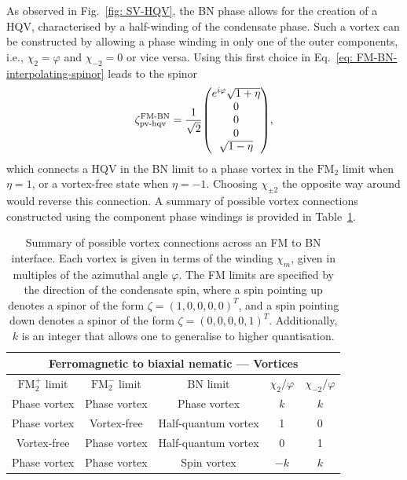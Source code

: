 As observed in Fig.~\ref{fig: SV-HQV}, the BN phase allows for the creation
of a HQV, characterised by a half-winding of the condensate phase.
Such a vortex can be constructed by allowing a phase winding in only one of the
outer components, i.e., \(\chi_2 = \varphi \) and \(\chi_{-2} = 0\) or vice
versa.
Using this first choice in Eq.~\eqref{eq: FM-BN-interpolating-spinor} leads to
the spinor
\begin{align}\label{eq: FM-BN-pv-hqv}
    \zeta^\text{FM-BN}_\text{pv-hqv} = \frac{1}{\sqrt{2}}\mqty(
    e^{i\varphi} \sqrt{1 + \eta} \\
    0 \\
    0 \\
    0 \\
    \sqrt{1 - \eta}),
\end{align}
which connects a HQV in the BN limit to a phase vortex in the \(\text{FM}_2\)
limit when \(\eta = 1\), or a vortex-free state when \(\eta = -1\).
Choosing \(\chi_{\pm 2}\) the opposite way around would reverse this connection.
A summary of possible vortex connections constructed using the component phase
windings is provided in Table~\ref{tab: FM-BN-vortices}.
\begin{table}
    \centering
    \begin{tabular}{ccccc}
        \toprule
        \multicolumn{5}{c}{Ferromagnetic to biaxial nematic --- Vortices} \\
        \midrule
        \(\text{FM}_2^+\) limit & \(\text{FM}_2^-\) limit & BN limit
            & \(\chi_2/\varphi \) & \(\chi_{-2}/\varphi \)  \\
        \midrule
         Phase vortex & Phase vortex & Phase vortex & \(k\) & \(k\) \\ 
         Phase vortex & Vortex-free & Half-quantum vortex & 1 & 0 \\
         Vortex-free & Phase vortex & Half-quantum vortex & 0 & 1 \\
         Phase vortex & Phase vortex & Spin vortex  & \(-k\) & \(k\) \\
        \bottomrule
    \end{tabular}
    \caption[Examples of possible vortex connections across a ferromagnetic
    to biaxial nematic interface]{\label{tab: FM-BN-vortices}
    Summary of possible vortex connections across an FM to BN interface.
    Each vortex is given in terms of the winding \(\chi_m\), given in multiples
    of the azimuthal angle \(\varphi \).
    The FM limits are specified by the direction of the condensate spin, where
    a spin pointing up denotes a spinor of the form
    \(\zeta={(1, 0, 0, 0, 0)}^T\), and a spin pointing down denotes a spinor of
    the form \(\zeta={(0, 0, 0, 0, 1)}^T\).
    Additionally, \(k\) is an integer that allows one to generalise to higher
    quantisation.}
\end{table}

